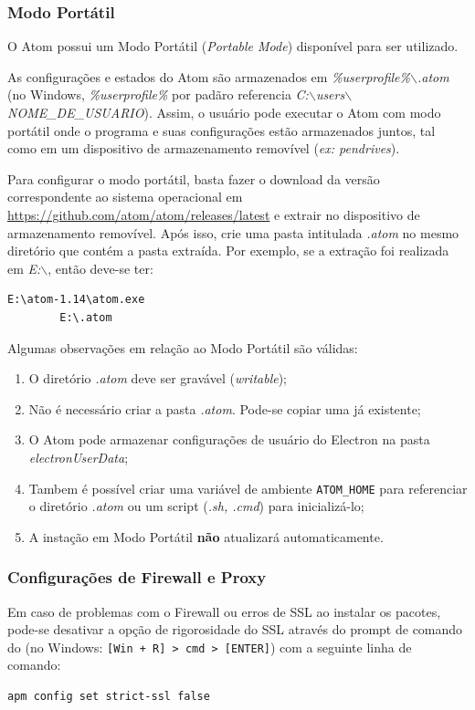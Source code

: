 	\subsubsection{Modo Portátil}\label{sec:portable}
	O Atom possui um Modo Portátil (\textit{Portable Mode}) disponível para ser utilizado.

	As configurações e estados do Atom são armazenados em \textit{\%userprofile\%$\backslash$.atom} (no Windows, \textit{\%userprofile\%} por padãro referencia \textit{C:$\backslash$users$\backslash$NOME\_DE\_USUARIO}). Assim, o usuário pode executar o Atom com modo portátil onde o programa e suas configurações estão armazenados juntos, tal como em um dispositivo de armazenamento removível (\textit{ex: pendrives}).

	Para configurar o modo portátil, basta fazer o download da versão correspondente ao sistema operacional em \href{https://github.com/atom/atom/releases/latest}{https://github.com/atom/atom/releases/latest} e extrair no dispositivo de armazenamento removível. Após isso, crie uma pasta intitulada \textit{.atom} no mesmo diretório que contém a pasta extraída. Por exemplo, se a extração foi realizada em \textit{E:$\backslash$}, então deve-se ter:
	\begin{Verbatim}[fontsize=\footnotesize]
		E:\atom-1.14\atom.exe
		E:\.atom
	\end{Verbatim}
	Algumas observações em relação ao Modo Portátil são válidas:
	\begin{enumerate}
		\item O diretório \textit{.atom} deve ser gravável (\textit{writable});
		\item Não é necessário criar a pasta \textit{.atom}. Pode-se copiar uma já existente;
		\item O Atom pode armazenar configurações de usuário do Electron na pasta \textit{electronUserData};
		\item Tambem é possível criar uma variável de ambiente \verb|ATOM_HOME| para referenciar o diretório \textit{.atom} ou um script (\textit{.sh, .cmd}) para inicializá-lo;
		\item A instação em Modo Portátil \textbf{não} atualizará automaticamente.
	\end{enumerate}

	\subsubsection{Configurações de Firewall e Proxy}\label{sec:fireproxy}
	Em caso de problemas com o Firewall ou erros de SSL ao instalar os pacotes, pode-se desativar a opção de rigorosidade do SSL através do prompt de comando do (no Windows: \verb|[Win + R] > cmd > [ENTER]|) com a seguinte linha de comando:
	\begin{Verbatim}[fontsize=\footnotesize]
		apm config set strict-ssl false
	\end{Verbatim}

